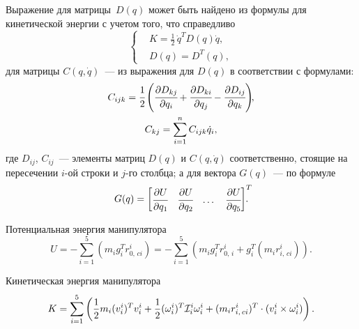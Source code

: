 Выражение для матрицы~$D(q)$ может быть найдено из формулы для кинетической энергии с учетом того, что справедливо
\begin{equation}\label{eq_K_in_form_with_D}
	\left\{
	\begin{aligned}
	\!& K = \frac{1}{2} \, \dot{q}^T D(q) \dot{q}, \\
	\!& D(q) = D^T\!(q),
	\end{aligned}
	\right.
\end{equation}
для матрицы $C(q,\dot{q})$~--- из выражения для $D(q)$ в соответствии с формулами:
\begin{gather}
	C_{ijk} = \cfrac{1}{2} \left( \cfrac{\partial D_{kj}}{\partial q_i} + \cfrac{\partial D_{ki}}{\partial q_j} - \cfrac{\partial D_{ij}}{\partial q_k}\right)\!\!,
	\\
	C_{kj} = \sum_{i = 1}^n C_{ijk} \dot{q}_i,
\end{gather}
где $D_{ij}$, $C_{ij}$~--- элементы матриц $D(q)$ и $C(q,\dot{q})$ соответственно, стоящие на пересечении $i$-ой строки и $j$-го столбца;
а для вектора $G(q)$~--- по формуле
\begin{equation}
	G(q) =
	\begin{bmatrix}
		\cfrac{\partial U}{\partial q_1} &
		\cfrac{\partial U}{\partial q_2} &
		\dots &
		\cfrac{\partial U}{\partial q_5}
	\end{bmatrix}^T\!\!\!\!\!\ldotp
\end{equation}

Потенциальная энергия манипулятора
\begin{equation}
    U =  -\sum_{i=1}^5 \left( m_i g_i^T r^i_{0,\,ci} \right) = -\sum_{i=1}^5 \left( m_i g_i^T r^i_{0,\,i} + g_i^T (m_ir^i_{i,\,ci}) \right)\!.
\end{equation}

Кинетическая энергия манипулятора
\begin{equation}\label{eq_eq_for_K_for_linear_model}
	K = \sum_{i=1}^5 \left( \frac{1}{2} m_i (v^i_i)^T v^i_i + \frac{1}{2} (\omega^i_i)^T \mathcal{I}^{i}_i \omega^i_i + (m_ir^i_{i,\,ci})^T \cdot (v^i_i \times \omega^i_i) \right)  \ldotp
\end{equation}


